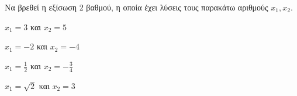 Να βρεθεί η εξίσωση 2 βαθμού, η οποία έχει λύσεις τους παρακάτω αριθμούς $ x_1,x_2 $.
\begin{alist}
\item $ x_1=3 $ και $ x_2=5 $
\item $ x_1=-2 $ και $ x_2=-4 $
\item $ x_1=\frac{1}{2} $ και $ x_2=-\frac{3}{4} $
\item $ x_1=\sqrt{2} $ και $ x_2=3 $
\end{alist}
